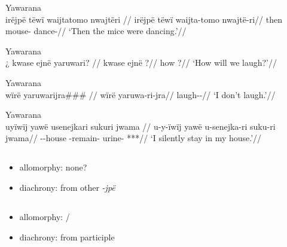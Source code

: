 \documentclass{memoir}
\begin{document}
\ex Yawarana \\
\label{ctorat-16}    \begingl
    \glpreamble  irëjpë tëwï waijtatomo nwajtëri //
    \gla irëjpë tëwï waijta-tomo nwajtë-ri//
    \glb then  mouse- dance-//
        \glft ‘Then the mice were dancing.’//  
    \endgl 
\xe

\ex Yawarana \\
\label{convrisamaj-06}    \begingl
    \glpreamble ¿ kwase ejnë yaruwari? //
    \gla kwase ejnë ?//
    \glb how  ?//
        \glft ‘How will we laugh?’//  
    \endgl 
\xe

\ex Yawarana \\
\label{convrisamaj-04}    \begingl
    \glpreamble  wïrë yaruwarijra\#\#\# //
    \gla wïrë yaruwa-ri-jra//
    \glb {} laugh--//
        \glft ‘I don’t laugh.’//  
    \endgl 
\xe

\ex Yawarana \\
\label{convrisamaj-28}    \begingl
    \glpreamble  uyïwïj yawë usenejkari sukuri jwama //
    \gla u-y-ïwïj yawë u-senejka-ri suku-ri jwama//
    \glb {}--house  -remain- urine- ***//
        \glft ‘I silently stay in my house.’//  
    \endgl 
\xe

\subsection{\texorpdfstring{}{}}

\begin{itemize}
\tightlist
\item
  allomorphy: none?
\item
  diachrony: from other \emph{-jpë}
\end{itemize}

\subsection{\texorpdfstring{}{}}

\begin{itemize}
\tightlist
\item
  allomorphy: /
\item
  diachrony: from participle
\end{itemize}

\subsection{\texorpdfstring{}{}}
\end{document}
